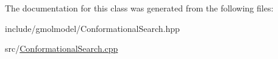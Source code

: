 The documentation for this class was generated from the following files\+:\begin{DoxyCompactItemize}
\item 
include/gmolmodel/Conformational\+Search.\+hpp\item 
src/\hyperlink{ConformationalSearch_8cpp}{Conformational\+Search.\+cpp}\end{DoxyCompactItemize}
